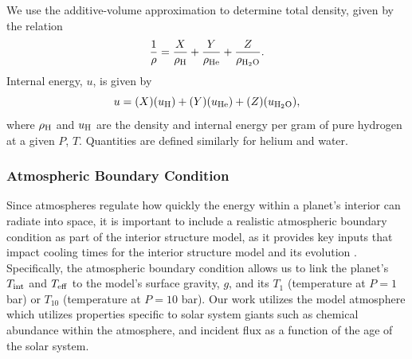 \documentclass[11pt]{ucscthesisbs}
\begin{document}
We use the additive-volume approximation to determine total density, given by the relation
\begin{equation}
  \frac{1}{\rho} = \frac{X}{\rho_{\rm H}} + \frac{Y}{\rho_{\rm He}} + \frac{Z}{\rho_{\rm H_{2}O }}.
\end{equation}
Internal energy, $u$, is given by
\begin{equation}
 u = (X)(u_{\rm H}) + (Y)(u_{\rm He}) + (Z)(u_{\rm H_{2}O}),
\end{equation}
where $\rho_{\rm H}$ and $u_{\rm H}$ are the density and internal energy per gram of pure hydrogen at a given $P$, $T$. Quantities are defined similarly for helium and water.

\subsubsection{Atmospheric Boundary Condition}
Since atmospheres regulate how quickly the energy within a planet's interior can radiate into space, it is important to include a realistic atmospheric boundary condition as part of the interior structure model, as it provides key inputs that impact cooling times for the interior structure model and its evolution \citep{1975ApJ...199..265G,fortney_2011}. Specifically, the atmospheric boundary condition allows us to link the planet's $T_{\rm int}$ and $T_{\rm eff}$ to the model's surface gravity, $g$, and its $T_{1}$ (temperature at $P = 1$ bar) or $T_{10}$ (temperature at $P = 10$ bar). Our work utilizes the \citep{fortney_2011} model atmosphere which utilizes properties specific to solar system giants such as chemical abundance within the atmosphere, and incident flux as a function of the age of the solar system. 
\end{document}
